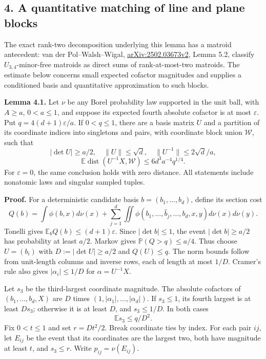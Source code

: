 \documentclass[
  11pt,
]{article}
\begin{document}
\subsection{4. A quantitative matching of line and plane
blocks}\label{a-quantitative-matching-of-line-and-plane-blocks}

The exact rank-two decomposition underlying this lemma has a matroid
antecedent: van der Pol--Walsh--Wigal,
\href{https://arxiv.org/html/2502.03673v2\#S5}{arXiv:2502.03673v2},
Lemma 5.2, classify \(U_{3,4}\)-minor-free matroids as direct sums of
rank-at-most-two matroids. The estimate below concerns small expected
cofactor magnitudes and supplies a conditioned basis and quantitative
approximation to such blocks.

\textbf{Lemma 4.1.} Let \(\nu\) be any Borel probability law supported
in the unit ball, with \(A\ge a\), \(0<a\le1\), and suppose its expected
fourth absolute cofactor is at most \(\varepsilon\). Put
\(q=4(d+1)\varepsilon/a\). If \(0<q\le1\), there are a basis matrix
\(U\) and a partition of its coordinate indices into singletons and
pairs, with coordinate block union \(\mathcal W\), such that \[
 |\det U|\ge a/2,\quad \|U\|\le\sqrt d,\quad
 \|U^{-1}\|\le2\sqrt d/a,
\] \[
 \mathbb E\operatorname{dist}(U^{-1}X,\mathcal W)
 \le6d^3a^{-4}q^{1/4}.                                       \tag{4.1}
\] For \(\varepsilon=0\), the same conclusion holds with zero distance.
All statements include nonatomic laws and singular sampled tuples.

\textbf{Proof.} For a deterministic candidate basis
\(b=(b_1,\ldots,b_d)\), define its section cost \[
 Q(b)=\int\phi(b,x)d\nu(x)
 +\sum_{j=1}^d\iint\phi(b_1,\ldots,\widehat b_j,\ldots,b_d,x,y)
                         d\nu(x)d\nu(y).
\] Tonelli gives \(\mathbb E_bQ(b)\le(d+1)\varepsilon\). Since
\(|\det b|\le1\), the event \(|\det b|\ge a/2\) has probability at least
\(a/2\). Markov gives \(\mathbb P(Q>q)\le a/4\). Thus choose \(U=(b_i)\)
with \(D:=|\det U|\ge a/2\) and \(Q(U)\le q\). The norm bounds follow
from unit-length columns and inverse rows, each of length at most
\(1/D\). Cramer's rule also gives \(|\alpha_i|\le1/D\) for
\(\alpha=U^{-1}X\).

Let \(s_3\) be the third-largest coordinate magnitude. The absolute
cofactors of \((b_1,\ldots,b_d,X)\) are \(D\) times
\((1,|\alpha_1|,\ldots,|\alpha_d|)\). If \(s_3\le1\), its fourth largest
is at least \(Ds_3\); otherwise it is at least \(D\), and \(s_3\le1/D\).
In both cases \[
 \mathbb E s_3\le q/D^2.                                      \tag{4.2}
\] Fix \(0<t\le1\) and set \(r=Dt^2/2\). Break coordinate ties by index.
For each pair \(ij\), let \(E_{ij}\) be the event that its coordinates
are the largest two, both have magnitude at least \(t\), and
\(s_3\le r\). Write \(p_{ij}=\nu(E_{ij})\).
\end{document}
